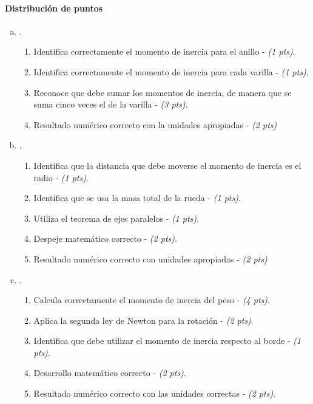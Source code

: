 \documentclass[
  12pt,
]{article}
\newcommand{\pts}[1]{ {\it (#1 pts)}}
\begin{document}
\begin{enumerate}[a)]
  \paragraph{Distribución de puntos}
  \renewcommand{\labelenumiv}{\theenumi\theenumiii-\arabic{enumiv})}
  \begin{enumerate}[a)]
      \item .
    \begin{enumerate}
      \item Identifica correctamente el momento de inercia para el anillo - \pts{1}.
      \item Identifica correctamente el momento de inercia para cada varilla - \pts{1}.
      \item Reconoce que debe sumar los momentos de inercia, de manera que
        se suma cinco veces el de la varilla - \pts{3}.
      \item Resultado numérico correcto con la unidades apropiadas - \pts{2}
    \end{enumerate}
      \item .
    \begin{enumerate}
    \item Identifica que la distancia que debe moverse el momento de inercia es
      el radio - \pts{1}.
    \item Identifica que se usa la masa total de la rueda - \pts{1}.
    \item Utiliza el teorema de ejes paralelos - \pts{1}.
    \item Despeje matemático correcto - \pts{2}.
    \item Resultado numérico correcto con unidades apropiadas - \pts{2}
    \end{enumerate}
      \item .
    \begin{enumerate}
      \item Calcula correctamente el momento de inercia del peso - \pts{4}.
      \item Aplica la segunda ley de Newton para la rotación - \pts{2}.
      \item Identifica que debe utilizar el momento de inercia respecto
        al borde - \pts{1}.
      \item Desarrollo matemático correcto - \pts{2}.
      \item Resultado numérico correcto con las unidades correctas - \pts{2}.
    \end{enumerate}
  \end{enumerate}
\end{enumerate}
\end{document}
